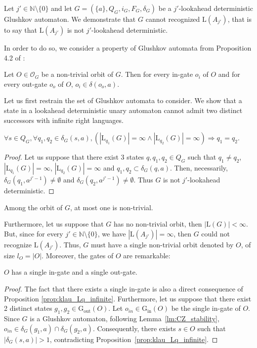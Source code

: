 \documentclass{llncs}
\begin{document}
	Let $j' \in \mathbb{N} \setminus \{0\}$ and let $G = (\{a\}, Q_G, {i_G}, F_G, \delta_G)$ be a $j'$-lookahead deterministic Glushkov automaton.
	We demonstrate that $G$ cannot recognized $\mathrm{L}(A_{j'})$, that is to say that $\mathrm{L}(A_{j'})$ is not $j'$-lookahead deterministic.
 
	In order to do so, we consider a property of Glushkov automata from Proposition 4.2 of \cite{CZ97}:
\begin{lemma}\label{lm:CZ_stability}
	Let $O \in \mathcal{O}_G$ be a non-trivial orbit of $G$.
	Then for every in-gate $o_i$ of $O$ and for every out-gate $o_o$ of $O$, $o_i \in \delta(o_o, a)$.
\end{lemma}

	Let us first restrain the set of Glushkov automata to consider.
	We show that a state in a lookahead deterministic unary automaton cannot admit two distinct successors with infinite right languages.

\begin{proposition}\label{prop:klau_Lq_infinite}
	$\forall s \in Q_G, \forall q_1, q_2 \in \delta_G(s, a), (|\mathrm{L}_{q_1}(G)| = \infty \wedge 	|\mathrm{L}_{q_2}(G)| = \infty) \Longrightarrow q_1 = q_2$.
\end{proposition}
\begin{proof}
	Let us suppose that there exist 3 states $q, q_1, q_2 \in Q_G$ such that $q_1 \neq q_2$, $|\mathrm{L}_{q_1}(G)| = \infty$, $|\mathrm{L}_{q_2}(G)| = \infty$ and ${q_1, q_2} \subset \delta_G(q, a)$.
	Then, necessarily, $\delta_G(q_1, a^{j'-1}) \neq \emptyset$ and $\delta_G(q_2, a^{j'-1}) \neq \emptyset$.
	Thus $G$ is not $j'$-lookahead deterministic.
\end{proof}

\begin{corollary}\label{prop:klau_orbite_non_triviale}
	Among the orbit of $G$, at most one is non-trivial.
\end{corollary}

	Furthermore, let us suppose that $G$ has no non-trivial orbit, then $|\mathrm{L}(G)| < \infty$.
But, since for every $j' \in \mathbb{N} \setminus \{0\}$, we have $|\mathrm{L}(A_{j'})| = \infty$, then $G$ could not recognize $\mathrm{L}(A_{j'})$.
Thus, $G$ must have a single non-trivial orbit denoted by $O$, of size $l_O = |O|$.
Moreover, the gates of $O$ are remarkable:

\begin{proposition}\label{prop:klau_portes_uniques}
	$O$ has a single in-gate and a single out-gate.
\end{proposition}
\begin{proof}
	The fact that there exists a single in-gate is also a direct consequence of Proposition \ref{prop:klau_Lq_infinite}.
	Furthermore, let us suppose that there exist 2 distinct states $g_1, g_2 \in \mathrm{G_{out}}(O)$.
	Let $o_{in} \in \mathrm{G_{in}}(O)$ be the single in-gate of $O$.
	Since $G$ is a Glushkov automaton, following Lemma~\ref{lm:CZ_stability}, $o_{in} \in \delta_G(g_1, a) \cap \delta_G(g_2, a)$.
	Consequently, there exists $s \in O$ such that $|\delta_G(s, a)| > 1$, contradicting Proposition~\ref{prop:klau_Lq_infinite}.
\end{proof}
\end{document}
